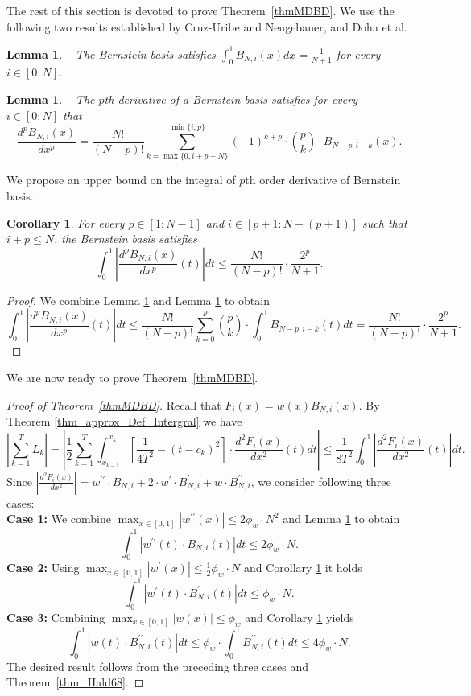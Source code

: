 \documentclass[11pt]{article}
\newcommand{\phiw}{\phi_{w}}
\newcommand{\prm}{\prime}
\renewcommand{\leq}{\leqslant}
\newtheorem{lem}[thm]{Lemma}
\newtheorem{cor}[thm]{Corollary}
\numberwithin{thm}{section}
\begin{document}
The rest of this section is devoted to prove Theorem~\ref{thmMDBD}. We use the following two results established by Cruz-Uribe and Neugebauer, and Doha et al.

\begin{lem}
\label{lem_int_n1}~\cite{CUN02,UN03} The Bernstein basis satisfies $\int_{0}^{1}B_{N,i}(x)dx=\frac{1}{N+1}$ for every $i\in[0:N]$.
\end{lem}

\begin{lem}
\label{lem_pder_Bni}~\cite{DBS11} The $p$th derivative of a Bernstein
basis satisfies for every $i\in[0:N]$ that
\[
\frac{d^{p}B_{N,i}(x)}{dx^{p}}=\frac{N!}{(N-p)!}\sum_{k=\max\{ 0,i+p-N\} }^{\min\{ i,p\} }(-1)^{k+p}\cdot{p \choose k}\cdot B_{N-p,i-k}(x).
\]
\end{lem}


We propose an upper bound on the integral of $p$th order derivative of Bernstein basis.
\begin{cor}
\label{cor_integral_derBB} For every $p\in[1:N-1]$ and
$i\in[p+1:N-(p+1)]$ such that $i+p\leq N$,
the Bernstein basis satisfies
\[
\int_{0}^{1}\left|\frac{d^{p}B_{N,i}(x)}{dx^{p}}(t)\right|dt\leq\frac{N!}{(N-p)!}\cdot\frac{2^{p}}{N+1}.
\]
\end{cor}

\begin{proof}
We combine Lemma \ref{lem_int_n1} and Lemma \ref{lem_pder_Bni} to obtain
\[
\int_{0}^{1}\left|\frac{d^{p}B_{N,i}(x)}{dx^{p}}(t)\right|dt\leq\frac{N!}{(N-p)!}\sum_{k=0}^{p}{p \choose k}\cdot\int_{0}^{1}B_{N-p,i-k}(t)dt=\frac{N!}{(N-p)!}\cdot\frac{2^{p}}{N+1}.
\]
\end{proof}


We are now ready to prove Theorem~\ref{thmMDBD}.

\begin{proof}[Proof of Theorem~\ref{thmMDBD}]
Recall that $F_i(x)=w(x)B_{N,i}(x)$. By Theorem \ref{thm_approx_Def_Intergral} we have
\[
\left|\sum_{k=1}^{T}L_{k}\right|=\left|\frac{1}{2}\sum_{k=1}^{T}\int_{x_{k-1}}^{x_{k}}\left[\frac{1}{4T^{2}}-(t-c_{k})^{2}\right]\cdot\frac{d^{2}F_i(x)}{dx^{2}}(t)dt\right|\leq\frac{1}{8T^{2}}\int_{0}^{1}\left|\frac{d^{2}F_i(x)}{dx^{2}}(t)\right|dt.
\]
Since $|\frac{d^{2}F_i(x)}{dx^{2}}|=w^{\prm\prm}\cdot B_{N,i}+2\cdot w^{\prm}\cdot B_{N,i}^{\prm}+w\cdot B_{N,i}^{\prm\prm}$,
we consider following three cases:\\
\textbf{Case 1:} We combine $\max_{x\in[0,1]}|w^{\prm\prm}(x)|\leq 2\phiw\cdot N^{2}$
and Lemma \ref{lem_int_n1} to obtain
\[
\int_{0}^{1}|w^{\prm\prm}(t)\cdot B_{N,i}(t)|dt\leq 2\phiw\cdot N.
\]
\textbf{Case 2:} Using $\max_{x\in[0,1]}|w^{\prm}(x)|\leq\frac{1}{2}\phiw\cdot N$
and Corollary \ref{cor_integral_derBB} it holds
\[
\int_{0}^{1}|w^{\prm}(t)\cdot B_{N,i}^{\prm}(t)|dt\leq \phiw\cdot N.
\]
\textbf{Case 3:} Combining $\max_{x\in[0,1]}|w(x)|\leq \phiw$
and Corollary \ref{cor_integral_derBB} yields
\[
\int_{0}^{1}|w(t)\cdot B_{N,i}^{\prm\prm}(t)|dt \leq \phiw\cdot \int_{0}^{1}B_{N,i}^{\prm\prm}(t)dt \leq 4\phiw\cdot N.
\]
The desired result follows from the preceding three cases and Theorem~\ref{thm_Hald68}.
\end{proof}
\end{document}
